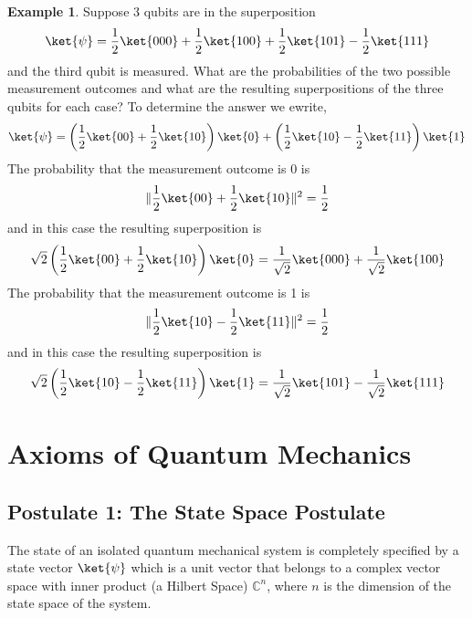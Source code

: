 \documentclass[12pt, oneside]{book}
\theoremstyle{definition}
\theoremstyle{definition}
\newtheorem{example}{Example}[section]
\theoremstyle{remark}
\begin{document}
\begin{example}
    Suppose 3 qubits are in the superposition
    \[\ket{\psi}=\frac{1}{2}\ket{000}+\frac{1}{2}\ket{100}+\frac{1}{2}\ket{101}-\frac{1}{2}\ket{111}\]
    and the third qubit is measured. What are the probabilities of the two possible measurement outcomes and what are the resulting superpositions of the three qubits for each case?
    To determine the answer we ewrite,
    \[
    \ket{\psi}=\left(\frac{1}{2}\ket{00}+\frac{1}{2}\ket{10}\right)\ket{0}+\left(\frac{1}{2}\ket{10}-\frac{1}{2}\ket{11}\right)\ket{1}
    \]
    The probability that the measurement outcome is 0 is
    \[
    \|\frac{1}{2}\ket{00}+\frac{1}{2}\ket{10}\|^2=\frac{1}{2}
    \]
    and in this case the resulting superposition is 
    \[
    \sqrt{2}\left(\frac{1}{2}\ket{00}+\frac{1}{2}\ket{10}\right)\ket{0}=\frac{1}{\sqrt{2}}\ket{000}+\frac{1}{\sqrt{2}}\ket{100}
    \]
    The probability that the measurement outcome is 1 is
    \[
    \|\frac{1}{2}\ket{10}-\frac{1}{2}\ket{11}\|^2=\frac{1}{2}
    \]
    and in this case the resulting superposition is
    \[
    \sqrt{2}\left(\frac{1}{2}\ket{10}-\frac{1}{2}\ket{11}\right)\ket{1}=\frac{1}{\sqrt{2}}\ket{101}-\frac{1}{\sqrt{2}}\ket{111}
    \]
\end{example}









\chapter{Axioms of Quantum Mechanics}
\section{Postulate 1: The State Space Postulate}
The state of an isolated quantum mechanical system is completely specified by a state vector $\ket{\psi}$ 
which is a unit vector that belongs to a complex vector space with inner product (a Hilbert Space) $\mathbb{C}^{n}$, where $n$ is the 
dimension of the state space of the system. 
\end{document}
